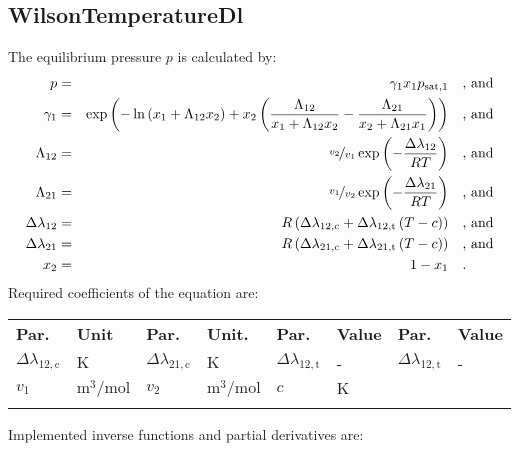 \subsection{WilsonTemperatureDl}
\label{cha:approaches:abs:act:wilson_tdl}
%
The equilibrium pressure $p$ is calculated by:
%
\begin{equation*}
	\begin{split}
		p &=& \gamma_1 x_1 p_\mathrm{sat,1} & \quad\text{, and} \\
		\gamma_1 &=& \exp \left( - \ln \left( x_1 + \Lambda_{12} x_2 \right) + x_2 \left( \frac{\Lambda_{12}}{x_1 + \Lambda_{12} x_2} - \frac{\Lambda_{21}}{x_2 + \Lambda_{21} x_1} \right) \right) & \quad\text{, and} \\
		\Lambda_{12} &=& \nicefrac{v_2}{v_1} \exp \left( - \frac{\Delta\lambda_{12}}{R T} \right) & \quad\text{, and} \\
		\Lambda_{21} &=& \nicefrac{v_1}{v_2} \exp \left( - \frac{\Delta\lambda_{21}}{R T} \right) & \quad\text{, and} \\
		\Delta\lambda_{12} &=& R \left( \Delta\lambda_\mathrm{12,c} + \Delta\lambda_\mathrm{12,t} \left( T - c \right) \right) & \quad\text{, and} \\
		\Delta\lambda_{21} &=& R \left( \Delta\lambda_\mathrm{21,c} + \Delta\lambda_\mathrm{21,t} \left( T - c \right) \right) & \quad\text{, and} \\
		x_2 &=& 1 - x_1  & \quad\text{.} \\
	\end{split}
\end{equation*}
%
Required coefficients of the equation are:
%
\begin{longtable}[l]{ll|ll|ll|ll}
\toprule
\addlinespace
\textbf{Par.} & \textbf{Unit} & \textbf{Par.} &	\textbf{Unit.} & \textbf{Par.} & \textbf{Value} & \textbf{Par.} & \textbf{Value} \\
\addlinespace
\midrule
\endhead

\bottomrule
\endfoot
\bottomrule
\endlastfoot
\addlinespace

$\Delta\lambda_\mathrm{12,c}$ & $\si{\kelvin}$ & $\Delta\lambda_\mathrm{21,c}$ & $\si{\kelvin}$ & $\Delta\lambda_\mathrm{12,t}$ & - & $\Delta\lambda_\mathrm{12,t}$ & - \\
$v_1$ & $\si{\cubic\meter\per\mole}$& $v_2$ & $\si{\cubic\meter\per\mole}$ &$c$ & $\si{\kelvin}$ & & \\

\addlinespace
\end{longtable}
%
Implemented inverse functions and partial derivatives are:
